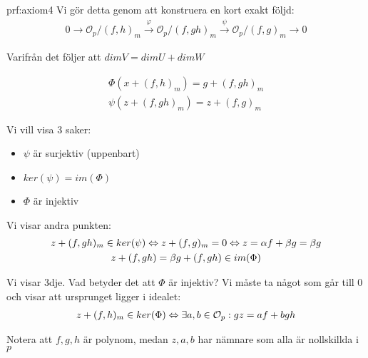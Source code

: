 \newpage
\begin{prf}[Axiom 4]{prf:axiom4}
  Vi gör detta genom att konstruera en kort exakt följd:
  \begin{equation*}
    \begin{gathered}
      0\to \mathcal{O}_p/(f,h)_m\stackrel{\varphi}{\to}\mathcal{O}_p/(f,gh)_m\stackrel{\psi}{\to}\mathcal{O}_p/(f,g)_m\to0
    \end{gathered}
  \end{equation*}\par
  \noindent Varifrån det följer att $dim V = dim U + dim W$
  \par\bigskip
  \begin{equation*}
    \begin{gathered}
      \Phi(x+(f,h)_m) = g+(f,gh)_m\\
      \psi(z+(f,gh)_m) = z+(f,g)_m
    \end{gathered}
  \end{equation*}
  \par\bigskip
  \noindent Vi vill visa 3 saker:\par
  \begin{itemize}
    \item $\psi$ är surjektiv (uppenbart)
    \item $ker(\psi) = im(\Phi)$
    \item $\Phi$ är injektiv
  \end{itemize}\par
  \noindent Vi visar andra punkten:
  \begin{equation*}
    \begin{gathered}
      z+(f,gh)_m\in ker(\psi)\Leftrightarrow z+(f,g)_m =0\Leftrightarrow z=\alpha f+\beta g = \beta g\\
      z+(f,gh) = \beta g+(f,gh)\in im(\Phi)
    \end{gathered}
  \end{equation*}
  \par\bigskip
  \noindent Vi visar 3dje. Vad betyder det att $\Phi$ är injektiv? Vi måste ta något som går till 0 och visar att ursprunget ligger i idealet:
  \begin{equation*}
    \begin{gathered}
      z +(f,h)_m\in ker(\Phi) \Leftrightarrow\exists a,b\in\mathcal{O}_p: gz = af+bgh
    \end{gathered}
  \end{equation*}
  \par\bigskip
  \noindent Notera att $f,g,h$ är polynom, medan $z,a,b$ har nämnare som alla är nollskillda i $p$

\end{prf}
